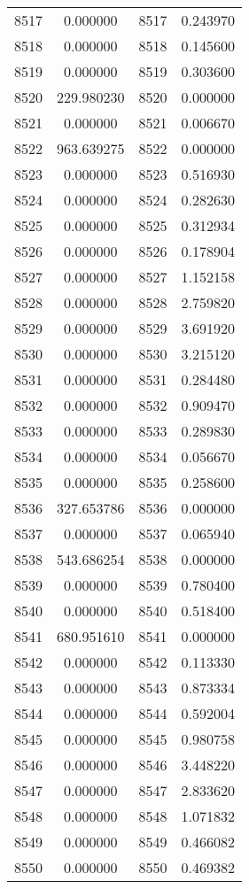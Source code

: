 \documentclass[12pt]{article}
\begin{document}
\begin{longtable}{@{}cccc@{}}
8517 & 0.000000 & 8517 & 0.243970 \\
8518 & 0.000000 & 8518 & 0.145600 \\
8519 & 0.000000 & 8519 & 0.303600 \\
8520 & 229.980230 & 8520 & 0.000000 \\
8521 & 0.000000 & 8521 & 0.006670 \\
8522 & 963.639275 & 8522 & 0.000000 \\
8523 & 0.000000 & 8523 & 0.516930 \\
8524 & 0.000000 & 8524 & 0.282630 \\
8525 & 0.000000 & 8525 & 0.312934 \\
8526 & 0.000000 & 8526 & 0.178904 \\
8527 & 0.000000 & 8527 & 1.152158 \\
8528 & 0.000000 & 8528 & 2.759820 \\
8529 & 0.000000 & 8529 & 3.691920 \\
8530 & 0.000000 & 8530 & 3.215120 \\
8531 & 0.000000 & 8531 & 0.284480 \\
8532 & 0.000000 & 8532 & 0.909470 \\
8533 & 0.000000 & 8533 & 0.289830 \\
8534 & 0.000000 & 8534 & 0.056670 \\
8535 & 0.000000 & 8535 & 0.258600 \\
8536 & 327.653786 & 8536 & 0.000000 \\
8537 & 0.000000 & 8537 & 0.065940 \\
8538 & 543.686254 & 8538 & 0.000000 \\
8539 & 0.000000 & 8539 & 0.780400 \\
8540 & 0.000000 & 8540 & 0.518400 \\
8541 & 680.951610 & 8541 & 0.000000 \\
8542 & 0.000000 & 8542 & 0.113330 \\
8543 & 0.000000 & 8543 & 0.873334 \\
8544 & 0.000000 & 8544 & 0.592004 \\
8545 & 0.000000 & 8545 & 0.980758 \\
8546 & 0.000000 & 8546 & 3.448220 \\
8547 & 0.000000 & 8547 & 2.833620 \\
8548 & 0.000000 & 8548 & 1.071832 \\
8549 & 0.000000 & 8549 & 0.466082 \\
8550 & 0.000000 & 8550 & 0.469382 \\

\end{longtable}
\end{document}
